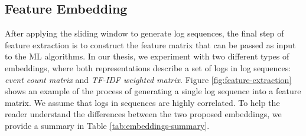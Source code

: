 \begin{figure}[!tbp] 
\end{figure}

\subsection{Feature Embedding}
\label{subsection:features}
After applying the sliding window to generate log sequences, the final step of feature extraction is to construct the feature matrix that can be passed as input to the ML algorithms. In our thesis, we experiment with two different types of embeddings, where both representations describe a set of logs in log sequences: \textit{event count matrix} and \textit{TF-IDF weighted matrix}. Figure \ref{fig:feature-extraction} shows an example of the process of generating a single log sequence into a feature matrix. We assume that logs in sequences are highly correlated. To help the reader understand the differences between the two proposed embeddings, we provide a summary in Table \ref{tab:embeddings-summary}.

